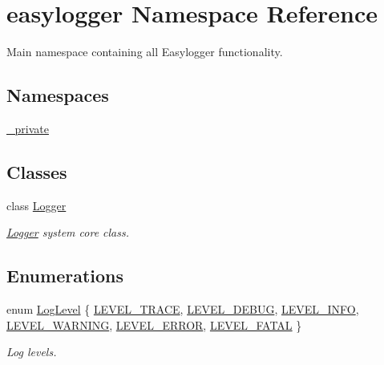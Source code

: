 \hypertarget{namespaceeasylogger}{}\section{easylogger Namespace Reference}
\label{namespaceeasylogger}


Main namespace containing all Easylogger functionality.  


\subsection*{Namespaces}
\begin{DoxyCompactItemize}
\item 
 \mbox{\hyperlink{namespaceeasylogger_1_1__private}{\+\_\+private}}
\end{DoxyCompactItemize}
\subsection*{Classes}
\begin{DoxyCompactItemize}
\item 
class \mbox{\hyperlink{classeasylogger_1_1_logger}{Logger}}
\begin{DoxyCompactList}\small\item\em \mbox{\hyperlink{classeasylogger_1_1_logger}{Logger}} system core class. \end{DoxyCompactList}\end{DoxyCompactItemize}
\subsection*{Enumerations}
\begin{DoxyCompactItemize}
\item 
enum \mbox{\hyperlink{namespaceeasylogger_a68cb882ead21af982c40e3621fcd50b0}{Log\+Level}} \{ \newline
\mbox{\hyperlink{namespaceeasylogger_a68cb882ead21af982c40e3621fcd50b0a2820ea169aea891644b08b235caac53e}{L\+E\+V\+E\+L\+\_\+\+T\+R\+A\+CE}}, 
\mbox{\hyperlink{namespaceeasylogger_a68cb882ead21af982c40e3621fcd50b0ac27a3104e9819d964346ff0c35d4ec9f}{L\+E\+V\+E\+L\+\_\+\+D\+E\+B\+UG}}, 
\mbox{\hyperlink{namespaceeasylogger_a68cb882ead21af982c40e3621fcd50b0a8149af81702a21899a109cf25d6bcf61}{L\+E\+V\+E\+L\+\_\+\+I\+N\+FO}}, 
\mbox{\hyperlink{namespaceeasylogger_a68cb882ead21af982c40e3621fcd50b0adfc13211fa89ecd524f3d99796b81571}{L\+E\+V\+E\+L\+\_\+\+W\+A\+R\+N\+I\+NG}}, 
\newline
\mbox{\hyperlink{namespaceeasylogger_a68cb882ead21af982c40e3621fcd50b0ab2ae9ec5d59b37d395bfa8d83d135245}{L\+E\+V\+E\+L\+\_\+\+E\+R\+R\+OR}}, 
\mbox{\hyperlink{namespaceeasylogger_a68cb882ead21af982c40e3621fcd50b0ad3f4aa5426450f9c171cb4c30a7f5ebb}{L\+E\+V\+E\+L\+\_\+\+F\+A\+T\+AL}}
 \}
\begin{DoxyCompactList}\small\item\em Log levels. \end{DoxyCompactList}\end{DoxyCompactItemize}


